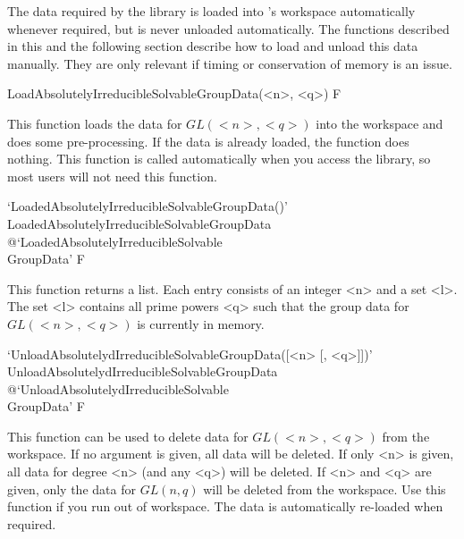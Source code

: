 The data required by the {\IRREDSOL} library is loaded into {\GAP}'s workspace automatically whenever required, but is never unloaded automatically. The functions described in this
and the following section describe how to load and unload this data manually. 
They are only relevant if timing or conservation of memory is an issue.

\>LoadAbsolutelyIrreducibleSolvableGroupData(<n>, <q>) F

This function loads the data for $GL(<n>, <q>)$ into the {\GAP} workspace and does 
some pre-processing. If the data is already loaded, the function does nothing. This 
function is called automatically when you access the
{\IRREDSOL} library, so most users  will not need this function.

\>`LoadedAbsolutelyIrreducibleSolvableGroupData()'%
{LoadedAbsolutelyIrreducibleSolvableGroupData}%
@{`LoadedAbsolutelyIrreducibleSolvable\\GroupData'} F

This function returns a list. Each entry consists of an integer <n> and a set <l>. The set
<l> contains all prime powers <q> such that the group data for $GL(<n>, <q>)$ is currently in memory.

\>`UnloadAbsolutelydIrreducibleSolvableGroupData([<n> [, <q>]])'%
{UnloadAbsolutelydIrreducibleSolvableGroupData}%
@{`UnloadAbsolutelydIrreducibleSolvable\\GroupData'} F

This function can be used to delete data for $GL(<n>, <q>)$ from the {\GAP} workspace. If no argument
is given, all data will be deleted. If only <n> is given, all data for degree <n> (and any <q>) will
be deleted. If <n> and <q> are given, only the data for $GL(n, q)$ will be deleted from the {\GAP}
workspace. Use this function if you run out of {\GAP} workspace. The
data is automatically re-loaded when required.


